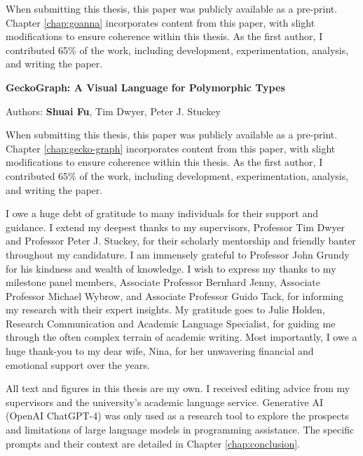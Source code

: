 \documentclass[
11pt, %
english, %
singlespacing, %
headsepline, %
]{MastersDoctoralThesis} %
\begin{document}
\begin{publications}
When submitting this thesis, this paper was publicly available as a pre-print. Chapter \ref{chap:goanna} incorporates content from this paper, with slight modifications to ensure coherence within this thesis. As the first author, I contributed 65\% of the work, including development, experimentation, analysis, and writing the paper.



\vspace{30px}


\noindent
\textbf{GeckoGraph: A Visual Language for Polymorphic Types}

\noindent
Authors: \textbf{Shuai Fu}, Tim Dwyer, Peter J. Stuckey
\vspace{10px}

When submitting this thesis, this paper was publicly available as a pre-print. Chapter \ref{chap:gecko-graph} incorporates content from this paper, with slight modifications to ensure coherence within this thesis. As the first author, I contributed 65\% of the work, including development, experimentation, analysis, and writing the paper.

\end{publications}




\begin{acknowledgements}
\addchaptertocentry{\acknowledgementname} %

I owe a huge debt of gratitude to many individuals for their support and guidance. I extend my deepest thanks to my supervisors, Professor Tim Dwyer and Professor Peter J. Stuckey, for their scholarly mentorship and friendly banter throughout my candidature. I am immensely grateful to Professor John Grundy for his kindness and wealth of knowledge. I wish to express my thanks to my milestone panel members, Associate Professor Bernhard Jenny, Associate Professor Michael Wybrow, and Associate Professor Guido Tack, for informing my research with their expert insights. My gratitude goes to Julie Holden, Research Communication and Academic Language Specialist, for guiding me through the often complex terrain of academic writing. Most importantly, I owe a huge thank-you to my dear wife, Nina, for her unwavering financial and emotional support over the years.
 
All text and figures in this thesis are my own. I received editing advice from my supervisors and the university's academic language service. Generative AI (OpenAI ChatGPT-4) was only used as a research tool to explore the prospects and limitations of large language models in programming assistance. The specific prompts and their context are detailed in Chapter \ref{chap:conclusion}.

\end{acknowledgements}
\end{document}
